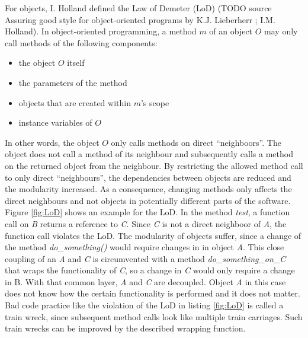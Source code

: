 For objects, I. Holland defined the Law of Demeter (LoD) (TODO source Assuring good style for object-oriented programs by K.J. Lieberherr ; I.M. Holland).
In object-oriented programming, a method $m$ of an object $O$ may only call methods of the following components:
\begin{itemize}
    \item the object $O$ itself
    \item the parameters of the method
    \item objects that are created within $m$'s scope
    \item instance variables of $O$
\end{itemize}
In other words, the object $O$ only calls methods on direct \enquote{neighboors}. The object does not call a method of its neighbour and subsequently calls a method on the returned object from the neighbour. By restricting the allowed method call to only direct \enquote{neighbours}, the dependencies between objects are reduced and the modularity increased. As a consequence, changing methods only affects the direct neighbours and not objects in potentially different parts of the software. 
Figure \ref{fig:LoD} shows an example for the LoD. In the method \textit{test}, a function call on \textit{B} returns a reference to \textit{C}. Since \textit{C} is not a direct neighboor of \textit{A}, the function call violates the LoD. The modularity of objects suffer, since a change of the method \textit{do\_something()} would require changes in in object \textit{A}. This close coupling of an \textit{A} and \textit{C} is circumvented with a method \textit{do\_something\_on\_C} that wraps the functionality of \textit{C}, so a change in \textit{C} would only require a change in B. With that common layer, \textit{A} and \textit{C} are decoupled. Object \textit{A} in this case does not know how the certain functionality is performed and it does not matter.  
Bad code practice like the violation of the LoD in listing \ref{fig:LoD} is called a train wreck, since subsequent method calls look like multiple train carriages. Such train wrecks can be improved  by the described wrapping function.

